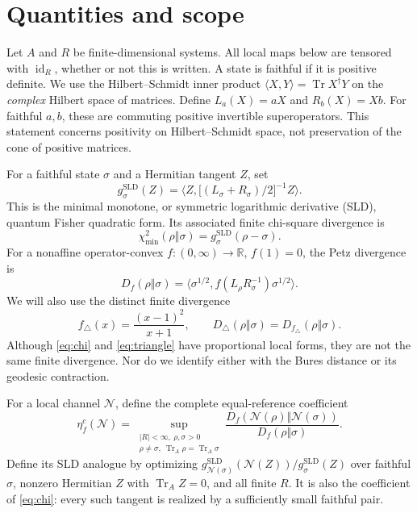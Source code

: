 \documentclass[11pt]{article}
\newcommand{\Tr}{\operatorname{Tr}}
\newcommand{\id}{\operatorname{id}}
\newcommand{\N}{\mathcal N}
\newcommand{\ip}[2]{\langle #1,#2\rangle}
\newcommand{\Dtri}{D_{\triangle}}
\newcommand{\gmin}{g^{\mathrm{SLD}}}
\theoremstyle{remark}
\begin{document}
\section{Quantities and scope}
Let \(A\) and \(R\) be finite-dimensional systems. All local maps below are tensored with \(\id_R\), whether or not this is written. A state is faithful if it is positive definite. We use the Hilbert--Schmidt inner product
\(\ip{X}{Y}=\Tr X^\dagger Y\) on the \emph{complex} Hilbert space of matrices. Define
\(L_a(X)=aX\) and \(R_b(X)=Xb\).
For faithful \(a,b\), these are commuting positive invertible superoperators. This statement concerns positivity on Hilbert--Schmidt space, not preservation of the cone of positive matrices.

For a faithful state \(\sigma\) and a Hermitian tangent \(Z\), set
\begin{equation}\label{eq:sld}
 \gmin_\sigma(Z)=
 \ip{Z}{\bigl[(L_\sigma+R_\sigma)/2\bigr]^{-1}Z}.
\end{equation}
This is the minimal monotone, or symmetric logarithmic derivative (SLD), quantum Fisher quadratic form. Its associated finite chi-square divergence is
\begin{equation}\label{eq:chi}
 \chi^2_{\min}(\rho\Vert\sigma)=\gmin_\sigma(\rho-\sigma).
\end{equation}
For a nonaffine operator-convex \(f:(0,\infty)\to\mathbb R\), \(f(1)=0\), the Petz divergence is
\begin{equation}\label{eq:petz}
 D_f(\rho\Vert\sigma)=
 \ip{\sigma^{1/2}}{f(L_\rho R_\sigma^{-1})\sigma^{1/2}}.
\end{equation}
We will also use the distinct finite divergence
\begin{equation}\label{eq:triangle}
 f_\triangle(x)=\frac{(x-1)^2}{x+1},\qquad
 \Dtri(\rho\Vert\sigma)=D_{f_\triangle}(\rho\Vert\sigma).
\end{equation}
Although \eqref{eq:chi} and \eqref{eq:triangle} have proportional local forms, they are not the same finite divergence. Nor do we identify either with the Bures distance or its geodesic contraction.

For a local channel \(\N\), define the complete equal-reference coefficient
\begin{equation}\label{eq:complete}
 \eta_f^c(\N)=\sup_{\substack{|R|<\infty,\ \rho,\sigma>0\\
 \rho\ne\sigma,\ \Tr_A\rho=\Tr_A\sigma}}
 \frac{D_f(\N(\rho)\Vert\N(\sigma))}
      {D_f(\rho\Vert\sigma)}.
\end{equation}
Define its SLD analogue by optimizing
\(\gmin_{\N(\sigma)}(\N(Z))/\gmin_\sigma(Z)\)
over faithful \(\sigma\), nonzero Hermitian \(Z\) with \(\Tr_AZ=0\), and all finite \(R\).
It is also the coefficient of \eqref{eq:chi}: every such tangent is realized by a sufficiently small faithful pair.
\end{document}
